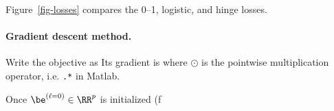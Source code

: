 Figure~\ref{fig-losses} compares the 0--1, logistic, and hinge losses.

   
\paragraph{Gradient descent method.}

Write the objective as
Its gradient is
where $\odot$ is the pointwise multiplication operator, i.e. \texttt{.*} in Matlab.
 
Once $\be^{(\ell=0)} \in \RR^{p}$ is initialized (f